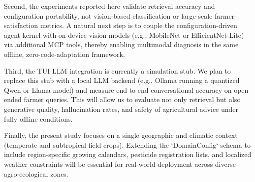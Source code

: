 Second, the experiments reported here validate retrieval accuracy and configuration portability, not vision-based classification or large-scale farmer-satisfaction metrics. A natural next step is to couple the configuration-driven agent kernel with on-device vision models (e.g., MobileNet or EfficientNet-Lite) via additional MCP tools, thereby enabling multimodal diagnosis in the same offline, zero-code-adaptation framework.

Third, the TUI LLM integration is currently a simulation stub. We plan to replace this stub with a local LLM backend (e.g., Ollama running a quantized Qwen or Llama model) and measure end-to-end conversational accuracy on open-ended farmer queries. This will allow us to evaluate not only retrieval but also generative quality, hallucination rates, and safety of agricultural advice under fully offline conditions.

Finally, the present study focuses on a single geographic and climatic context (temperate and subtropical field crops). Extending the `DomainConfig` schema to include region-specific growing calendars, pesticide registration lists, and localized weather constraints will be essential for real-world deployment across diverse agro-ecological zones.
